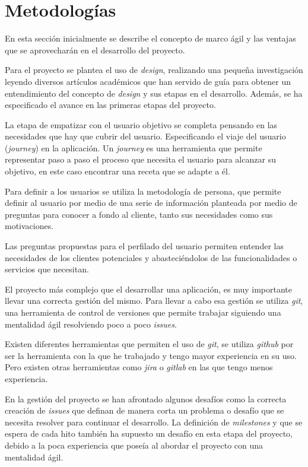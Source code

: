 \section{Metodologías}
En esta sección inicialmente se describe el concepto de marco ágil y las ventajas que se aprovecharán en el desarrollo del proyecto. 

Para el proyecto se plantea el uso de \emph{\gls{design}}, realizando una pequeña investigación leyendo diversos artículos académicos\cite{wolniak2017design}\cite{thoring2011understanding} que han servido de guía para obtener un entendimiento del concepto de \emph{\gls{design}} y sus etapas en el desarrollo. Además, se ha especificado el avance en las primeras etapas del proyecto.

La etapa de empatizar con el usuario objetivo se completa pensando en las necesidades que hay que cubrir del usuario. Especificando el viaje del usuario (\emph{\gls{journey}}) en la aplicación. Un \emph{\gls{journey}} es una herramienta que permite representar paso a paso el proceso que necesita el usuario para alcanzar su objetivo, en este caso encontrar una receta que se adapte a él. \cite{gasparini2015perspective}

Para definir a los usuarios se utiliza la metodología de persona, que permite definir al usuario por medio de una serie de información planteada por medio de preguntas para conocer a fondo al cliente, tanto sus necesidades como sus motivaciones. 

Las preguntas propuestas para el perfilado del usuario permiten entender las necesidades de los clientes potenciales y abasteciéndolos de las funcionalidades o servicios que necesitan.

El proyecto más complejo que el desarrollar una aplicación, es muy importante llevar una correcta gestión del mismo. Para llevar a cabo esa gestión se utiliza \emph{\Gls{git}}, una herramienta de control de versiones que permite trabajar siguiendo una mentalidad ágil resolviendo poco a poco \emph{\glspl{issue}}.

Existen diferentes herramientas que permiten el uso de \emph{\Gls{git}}, se utiliza \emph{\Gls{github}} por ser la herramienta con la que he trabajado y tengo mayor experiencia en su uso. Pero existen otras herramientas como \emph{\Gls{jira}} o \emph{\Gls{gitlab}} en las que tengo menos experiencia.

En la gestión del proyecto se han afrontado algunos desafíos como la correcta creación de \emph{\glspl{issue}} que definan de manera corta un problema o desafío que se necesita resolver para continuar el desarrollo. La definición de \emph{\glspl{milestone}} y que se espera de cada hito también ha supuesto un desafío en esta etapa del proyecto, debido a la poca experiencia que poseía al abordar el proyecto con una mentalidad ágil.

